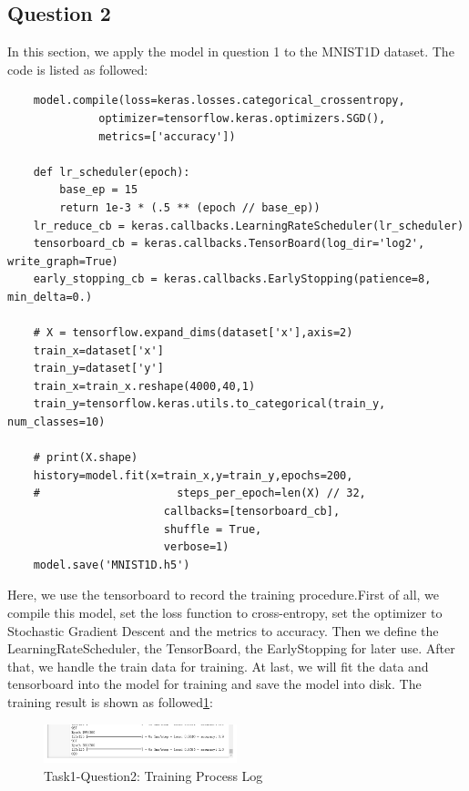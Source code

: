 \documentclass[conference]{IEEEtran}
\begin{document}
\subsection{Question 2}
In this section, we apply the model in question 1 to the MNIST1D dataset. The code is listed as followed:
\begin{lstlisting}
    model.compile(loss=keras.losses.categorical_crossentropy,
              optimizer=tensorflow.keras.optimizers.SGD(),
              metrics=['accuracy'])

    def lr_scheduler(epoch):
        base_ep = 15
        return 1e-3 * (.5 ** (epoch // base_ep))
    lr_reduce_cb = keras.callbacks.LearningRateScheduler(lr_scheduler)
    tensorboard_cb = keras.callbacks.TensorBoard(log_dir='log2', write_graph=True)
    early_stopping_cb = keras.callbacks.EarlyStopping(patience=8, min_delta=0.)

    # X = tensorflow.expand_dims(dataset['x'],axis=2)
    train_x=dataset['x']
    train_y=dataset['y']
    train_x=train_x.reshape(4000,40,1)
    train_y=tensorflow.keras.utils.to_categorical(train_y, num_classes=10)

    # print(X.shape)
    history=model.fit(x=train_x,y=train_y,epochs=200,
    #                     steps_per_epoch=len(X) // 32,
                        callbacks=[tensorboard_cb],                  
                        shuffle = True,
                        verbose=1)
    model.save('MNIST1D.h5')
\end{lstlisting}
Here, we use the tensorboard to record the training procedure.First of all, we compile this model, set the loss function to cross-entropy, set the optimizer to Stochastic Gradient Descent and the metrics to accuracy. 
Then we define the LearningRateScheduler, the TensorBoard, the EarlyStopping for later use.
After that, we handle the train data for training.
At last, we will fit the data and tensorboard into the model for training and save the model into disk.
The training result is shown as followed\ref{Fig.t1q2}:
\begin{figure}[h] 
    \centering %
    \includegraphics[width=0.5\textwidth]{T1Q2.png} %
    \caption{Task1-Question2: Training Process Log} %
    \label{Fig.t1q2} %
\end{figure}
\end{document}
